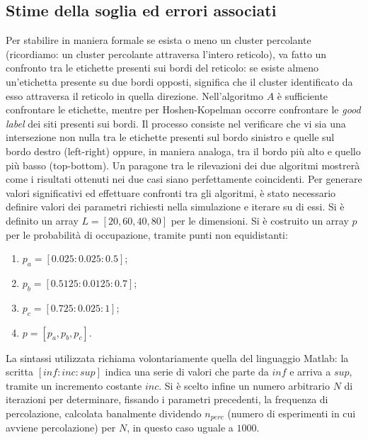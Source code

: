 \subsection*{Stime della soglia ed errori associati}
Per stabilire in maniera formale se esista o meno un cluster percolante (ricordiamo: un cluster 
percolante attraversa l'intero reticolo), va fatto un confronto tra le etichette presenti sui bordi
del reticolo: se esiste almeno un'etichetta presente su due bordi opposti, significa che il cluster 
identificato da esso attraversa il reticolo in quella direzione. 
Nell'algoritmo $A$ è sufficiente confrontare le etichette, mentre per Hoshen-Kopelman occorre 
confrontare le \textit{good label} dei siti presenti sui bordi.
Il processo consiste nel verificare che vi sia una intersezione non nulla tra le etichette 
presenti sul bordo sinistro e quelle sul bordo destro (left-right) oppure, in maniera analoga,
tra il bordo più alto e quello più basso (top-bottom).
Un paragone tra le rilevazioni dei due algoritmi mostrerà come i risultati ottenuti nei due casi 
siano perfettamente coincidenti.
Per generare valori significativi ed effettuare confronti tra gli algoritmi, è stato necessario 
definire valori dei parametri richiesti nella simulazione e iterare su di essi.
Si è definito un array $L = [20,60,40,80]$ per le dimensioni.
Si è costruito un array $p$ per le probabilità di occupazione, tramite punti non equidistanti:
\begin{enumerate}
    \item $p_a = [0.025:0.025:0.5]$;
    \item $p_b = [0.5125:0.0125:0.7]$;
    \item $p_c = [0.725:0.025:1]$;
    \item $p = [p_a,p_b,p_c]$.
\end{enumerate}
La sintassi utilizzata richiama volontariamente quella del linguaggio Matlab: 
la scritta $[inf : inc : sup]$ indica una serie di valori che parte da $inf$ e arriva
a $sup$, tramite un incremento costante $inc$.
Si è scelto infine un numero arbitrario $N$ di iterazioni per determinare, fissando 
i parametri precedenti, la frequenza
di percolazione, calcolata banalmente dividendo $n_{perc}$ (numero di esperimenti in 
cui avviene percolazione) per $N$, in questo caso uguale a $1000$. 
